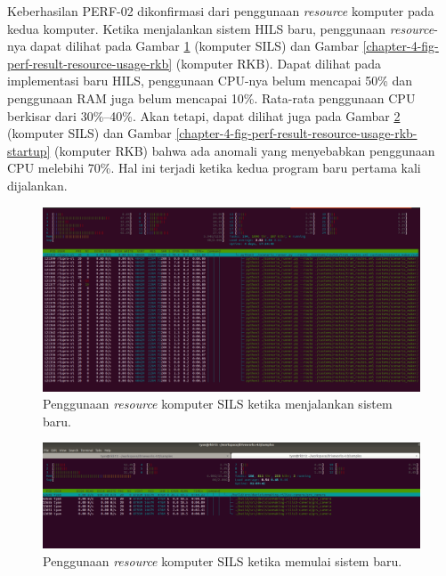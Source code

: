 Keberhasilan PERF-02 dikonfirmasi dari penggunaan \textit{resource} komputer
pada kedua komputer. Ketika menjalankan sistem HILS baru, penggunaan
\textit{resource}-nya dapat dilihat pada Gambar
\ref{chapter-4-fig-perf-result-resource-usage-sils} (komputer SILS) dan Gambar
\ref{chapter-4-fig-perf-result-resource-usage-rkb} (komputer RKB). Dapat dilihat
pada implementasi baru HILS, penggunaan CPU-nya belum mencapai 50\% dan
penggunaan RAM juga belum mencapai 10\%. Rata-rata penggunaan CPU berkisar dari
30\%--40\%. Akan tetapi, dapat dilihat juga pada Gambar
\ref{chapter-4-fig-perf-result-resource-usage-sils-startup} (komputer SILS) dan
Gambar \ref{chapter-4-fig-perf-result-resource-usage-rkb-startup} (komputer RKB)
bahwa ada anomali yang menyebabkan penggunaan CPU melebihi 70\%.  Hal ini
terjadi ketika kedua program baru pertama kali dijalankan.
\begin{figure}[!htbp]
	\centering
	\includegraphics[width=1.0\textwidth]{resources/chapter-4/resource-usage-new-hils-sils-startup.png}
	\caption{Penggunaan \textit{resource} komputer SILS ketika menjalankan sistem baru.}
	\label{chapter-4-fig-perf-result-resource-usage-sils}
\end{figure}
\begin{figure}[!htbp]
	\centering
	\includegraphics[width=1.0\textwidth]{resources/chapter-4/resource-usage-new-hils-rkb.png}
	\caption{Penggunaan \textit{resource} komputer SILS ketika memulai sistem baru.}
	\label{chapter-4-fig-perf-result-resource-usage-sils-startup}
\end{figure}
